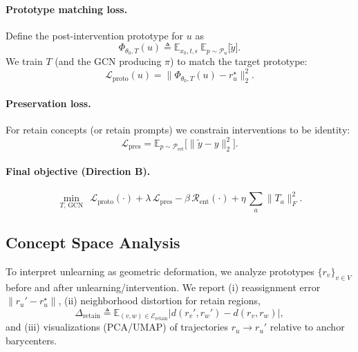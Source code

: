 \paragraph{Prototype matching loss.}
Define the post-intervention prototype for $u$ as
\begin{equation}
\Phi_{\theta_0,T}(u) \triangleq \mathbb{E}_{x_0,t,\epsilon}\ \mathbb{E}_{p\sim\mathcal{P}_u}\big[\tilde{y}\big].
\end{equation}
We train $T$ (and the GCN producing $\pi$) to match the target prototype:
\begin{equation}
\mathcal{L}_{\mathrm{proto}}(u) =
\big\| \Phi_{\theta_0,T}(u) - r_u^{\star} \big\|_2^2.
\label{eq:proto-loss}
\end{equation}

\paragraph{Preservation loss.}
For retain concepts (or retain prompts) we constrain interventions to be identity:
\begin{equation}
\mathcal{L}_{\mathrm{pres}} =
\mathbb{E}_{p\sim\mathcal{P}_{\mathrm{ret}}}\big[\|\tilde{y}-y\|_2^2\big].
\label{eq:pres-loss}
\end{equation}

\paragraph{Final objective (Direction B).}
\begin{equation}
\min_{T,\,\mathrm{GCN}}
\ \ \mathcal{L}_{\mathrm{proto}}(\cdot)
+ \lambda\,\mathcal{L}_{\mathrm{pres}}
- \beta\,\mathcal{R}_{\mathrm{ent}}(\cdot)
+ \eta\,\sum_{a}\|T_a\|_F^2.
\label{eq:objective-B}
\end{equation}

\subsection{Concept Space Analysis}
\label{sec:space}

To interpret unlearning as geometric deformation, we analyze prototypes $\{r_v\}_{v\in V}$ before and after unlearning/intervention.
We report (i) reassignment error $\|r_u' - r_u^{\star}\|$, (ii) neighborhood distortion for retain regions,
\begin{equation}
\Delta_{\mathrm{retain}} \triangleq
\mathbb{E}_{(v,w)\in \mathcal{E}_{\mathrm{retain}}}
\big|d(r_v',r_w') - d(r_v,r_w)\big|,
\end{equation}
and (iii) visualizations (PCA/UMAP) of trajectories $r_u \rightarrow r_u'$ relative to anchor barycenters.


